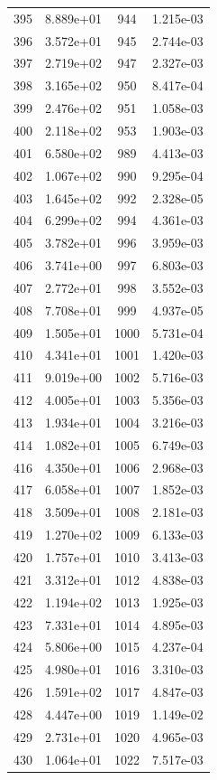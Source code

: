 \documentclass[12pt]{article}
\begin{document}
\begin{longtable}{@{}cccc@{}}
395 & 8.889e+01 & 944 & 1.215e-03 \\
396 & 3.572e+01 & 945 & 2.744e-03 \\
397 & 2.719e+02 & 947 & 2.327e-03 \\
398 & 3.165e+02 & 950 & 8.417e-04 \\
399 & 2.476e+02 & 951 & 1.058e-03 \\
400 & 2.118e+02 & 953 & 1.903e-03 \\
401 & 6.580e+02 & 989 & 4.413e-03 \\
402 & 1.067e+02 & 990 & 9.295e-04 \\
403 & 1.645e+02 & 992 & 2.328e-05 \\
404 & 6.299e+02 & 994 & 4.361e-03 \\
405 & 3.782e+01 & 996 & 3.959e-03 \\
406 & 3.741e+00 & 997 & 6.803e-03 \\
407 & 2.772e+01 & 998 & 3.552e-03 \\
408 & 7.708e+01 & 999 & 4.937e-05 \\
409 & 1.505e+01 & 1000 & 5.731e-04 \\
410 & 4.341e+01 & 1001 & 1.420e-03 \\
411 & 9.019e+00 & 1002 & 5.716e-03 \\
412 & 4.005e+01 & 1003 & 5.356e-03 \\
413 & 1.934e+01 & 1004 & 3.216e-03 \\
414 & 1.082e+01 & 1005 & 6.749e-03 \\
416 & 4.350e+01 & 1006 & 2.968e-03 \\
417 & 6.058e+01 & 1007 & 1.852e-03 \\
418 & 3.509e+01 & 1008 & 2.181e-03 \\
419 & 1.270e+02 & 1009 & 6.133e-03 \\
420 & 1.757e+01 & 1010 & 3.413e-03 \\
421 & 3.312e+01 & 1012 & 4.838e-03 \\
422 & 1.194e+02 & 1013 & 1.925e-03 \\
423 & 7.331e+01 & 1014 & 4.895e-03 \\
424 & 5.806e+00 & 1015 & 4.237e-04 \\
425 & 4.980e+01 & 1016 & 3.310e-03 \\
426 & 1.591e+02 & 1017 & 4.847e-03 \\
428 & 4.447e+00 & 1019 & 1.149e-02 \\
429 & 2.731e+01 & 1020 & 4.965e-03 \\
430 & 1.064e+01 & 1022 & 7.517e-03 \\

\end{longtable}
\end{document}
